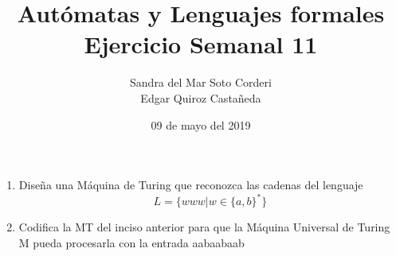 \documentclass{article}
\begin{document}
    \title{
        Autómatas y Lenguajes formales \\
        Ejercicio Semanal 11
    }

    \author{
        Sandra del Mar Soto Corderi \\
        Edgar Quiroz Castañeda
    }

    \date{
        09 de mayo del 2019
    }

    \maketitle

    \begin{enumerate}
        \item {
       	Diseña una Máquina de Turing que reconozca las cadenas del lenguaje
        \begin{equation*}
        	L = \{www | w \in \{a, b\}^* \}
        \end{equation*}
		}
		\item {
		Codifica la MT del inciso anterior para que la Máquina Universal de Turing M pueda procesarla con la entrada aabaabaab
		}
        
    \end{enumerate}
\end{document}
